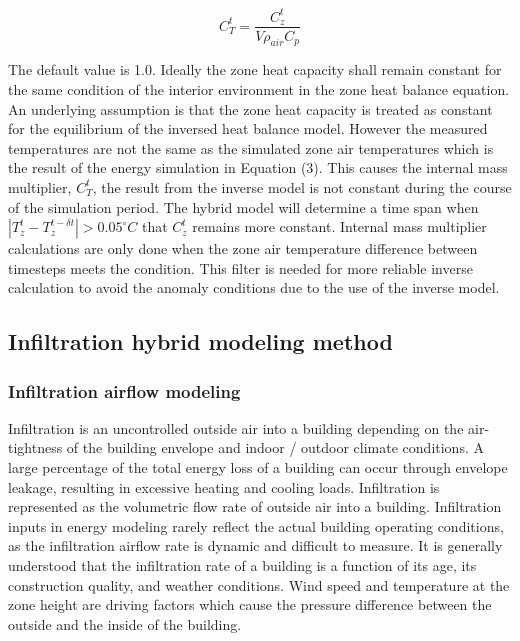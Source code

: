 \documentclass[11pt]{article}
\begin{document}
\begin{equation}
C_T^t = \frac{C_z^t} {V\rho_{air} C_p}
\end{equation}

The default value is 1.0. Ideally the zone heat capacity shall remain constant for the same condition of the interior environment in the zone heat balance equation. An underlying assumption is that the zone heat capacity is treated as constant for the equilibrium of the inversed heat balance model. However the measured temperatures are not the same as the simulated zone air temperatures which is the result of the energy simulation in Equation (3). This causes the internal mass multiplier, $C_T^t$, the result from the inverse model is not constant during the course of the simulation period. The hybrid model will determine a time span when $|T_z^t - T_z^{t-\delta t}| > 0.05^{\circ}C$ that $C_z^t$ remains more constant. Internal mass multiplier calculations are only done when the zone air temperature difference between timesteps meets the condition. This filter is needed for more reliable inverse calculation to avoid the anomaly conditions due to the use of the inverse model.  

\subsection{Infiltration hybrid modeling method}\label{Infiltration hybrid modeling method}

\subsubsection{Infiltration airflow modeling}\label{Infiltration airflow modeling}

Infiltration is an uncontrolled outside air into a building depending on the air-tightness of the building envelope and indoor / outdoor climate conditions. A large percentage of the total energy loss of a building can occur through envelope leakage, resulting in excessive heating and cooling loads. Infiltration is represented as the volumetric flow rate of outside air into a building. Infiltration inputs in energy modeling rarely reflect the actual building operating conditions, as the infiltration airflow rate is dynamic and difficult to measure. It is generally understood that the infiltration rate of a building is a function of its age, its construction quality, and weather conditions. Wind speed and temperature at the zone height are driving factors which cause the pressure difference between the outside and the inside of the building.
\end{document}
